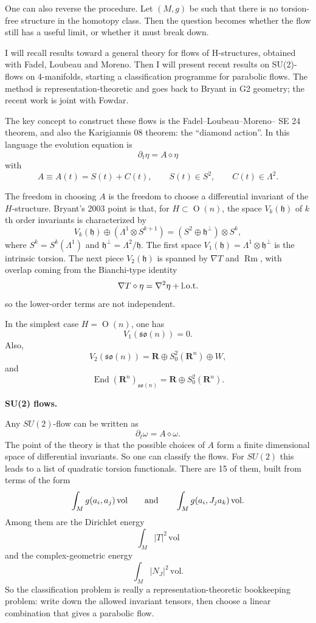 One can also reverse the procedure.
Let $(M,g)$ be such that there is no
torsion-free structure in the homotopy
class.
Then the question becomes whether the
flow still has a useful limit, or
whether it must break down.

I will recall results toward a general
theory for flows of H-structures,
obtained with Fadel, Loubeau and
Moreno.
Then I will present recent results on
SU(2)-flows on 4-manifolds, starting a
classification programme for
parabolic flows.
The method is representation-theoretic
and goes back to Bryant in G2 geometry;
the recent work is joint with Fowdar.

\medskip\noindent
The key concept to construct these
flows is the Fadel--Loubeau--Moreno--
SE 24 theorem, and also the Karigiannis
08 theorem: the ``diamond action''.
In this language the evolution equation
is
$$
        \partial_t \eta = A \diamond \eta
$$
with
$$
        A\equiv A(t)=S(t)+C(t),
        \qquad
        S(t)\in S^2,
        \qquad
        C(t)\in \Lambda^2.
$$

The freedom in choosing $A$ is the
freedom to choose a differential
invariant of the $H$-structure.
Bryant's 2003 point is that, for
$H\subset \operatorname{O}(n)$, the
space $V_k(\mathfrak h)$ of $k$th order
invariants is characterized by
$$
        V_k(\mathfrak h)\oplus
        (\Lambda^1\otimes S^{k+1})
        =
        (S^2\oplus\mathfrak h^\perp)
        \otimes S^k,
$$
where
$S^k=S^k(\Lambda^1)$ and
$\mathfrak h^\perp=\Lambda^2/\mathfrak h$.
The first space
$V_1(\mathfrak h)=\Lambda^1\otimes
\mathfrak h^\perp$ is the intrinsic
torsion.
The next piece $V_2(\mathfrak h)$ is
spanned by $\nabla T$ and
$\operatorname{Rm}$,
with overlap coming from the
Bianchi-type identity
$$
        \nabla T\diamond \eta
        =
        \nabla^2\eta+\hbox{l.o.t.}
$$
so the lower-order terms are not
independent.

In the simplest case $H=\operatorname{O}(n)$,
one has
$$
        V_1(\mathfrak{so}(n))=0.
$$
Also,
$$
        V_2(\mathfrak{so}(n))
        =
        \mathbf R
        \oplus
        S^2_0(\mathbf R^n)
        \oplus W,
$$
and
$$
        \operatorname{End}(\mathbf R^n)_
        {\mathfrak{so}(n)}
        =
        \mathbf R
        \oplus
        S^2_0(\mathbf R^n).
$$

\medskip\noindent
{\bf SU(2) flows.}

Any $SU(2)$-flow can be written as
$$
        \partial_t \omega = A\diamond\omega .
$$
The point of the theory is that the
possible choices of $A$ form a finite
dimensional space of differential
invariants.
So one can classify the flows.
For $SU(2)$ this leads to a list of
quadratic torsion functionals.
There are 15 of them, built from
terms of the form
$$
        \int_M g(a_i,a_j)\,\mathrm{vol}
        \qquad\hbox{and}\qquad
        \int_M g(a_i,J_j a_k)\,
        \mathrm{vol}.
$$
Among them are the Dirichlet energy
$$
        \int_M |T|^2\,\mathrm{vol}
$$
and the complex-geometric energy
$$
        \int_M |N_J|^2\,\mathrm{vol}.
$$
So the classification problem is
really a representation-theoretic
bookkeeping problem: write down the
allowed invariant tensors, then choose
a linear combination that gives a
parabolic flow.


